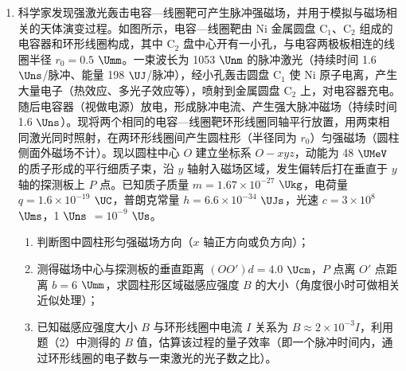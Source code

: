 \documentclass[\gkver]{gaokaozhenti}
\begin{document}
\begin{enumerate}
\item
科学家发现强激光轰击电容—线圈靶可产生脉冲强磁场，并用于模拟与磁场相关的天体演变过程。如图所示，电容—线圈靶由 Ni 金属圆盘 $\mathrm{C_{1}}$、$\mathrm{C_{2}}$ 组成的电容器和环形线圈构成，其中 $\mathrm{C_{2}}$ 盘中心开有一小孔，与电容两极板相连的线圈半径 $r_{0}=0.5$ $\Umm$。一束波长为 1053 $\Unm$ 的脉冲激光（持续时间 1.6 $\Uns$/脉冲、能量 198 $\UJ$/脉冲），经小孔轰击圆盘 $\mathrm{C_{1}}$ 使 Ni 原子电离，产生大量电子（热效应、多光子效应等），喷射到金属圆盘 $\mathrm{C_{2}}$ 上，对电容器充电。随后电容器（视做电源）放电，形成脉冲电流、产生强大脉冲磁场（持续时间 1.6 $\Uns$）。现将两个相同的电容—线圈靶环形线圈同轴平行放置，用两束相同激光同时照射，在两环形线圈间产生圆柱形（半径同为 $r_{0}$）匀强磁场（圆柱侧面外磁场不计）。现以圆柱中心 $O$ 建立坐标系 $O-xyz$，动能为 48 $\UMeV$ 的质子形成的平行细质子束，沿 $y$ 轴射入磁场区域，发生偏转后打在垂直于 $y$ 轴的探测板上 $P$ 点。已知质子质量 $m=1.67\times10^{-27}$ $\Ukg$，电荷量 $q=1.6\times10^{-19}$ $\UC$，普朗克常量 $h=6.6\times10^{-34}$ $\UJs$，光速 $c=3\times10^{8}$ $\Ums$，1 $\Uns$ $=10^{-9}$ $\Us$。
\begin{enumerate}
	\item
	判断图中圆柱形匀强磁场方向（$x$ 轴正方向或负方向）；
	\item
	测得磁场中心与探测板的垂直距离 $(OO')d=4.0$ $\Ucm$，$P$ 点离 $O'$ 点距离 $b=6$ $\Umm$，求圆柱形区域磁感应强度 $B$ 的大小（角度很小时可做相关近似处理）；
	\item
	已知磁感应强度大小 $B$ 与环形线圈中电流 $I$ 关系为 $B\approx2\times10^{-3}I$，利用题（2）中测得的 $B$ 值，估算该过程的量子效率（即一个脉冲时间内，通过环形线圈的电子数与一束激光的光子数之比）。
\end{enumerate}
\onepicture[align=right, w=6.60cm]{}
\end{enumerate}
\end{document}
